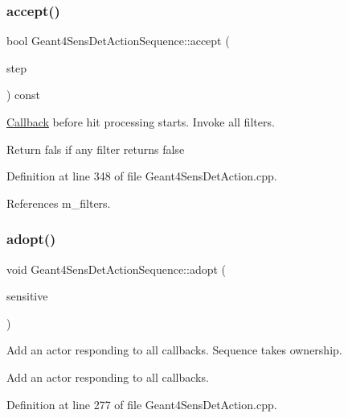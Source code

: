 \subsubsection{\texorpdfstring{accept()}{accept()}}
{\footnotesize\ttfamily bool Geant4\+Sens\+Det\+Action\+Sequence\+::accept (\begin{DoxyParamCaption}\item[{const G4\+Step $\ast$}]{step }\end{DoxyParamCaption}) const}



\hyperlink{class_d_d4hep_1_1_callback}{Callback} before hit processing starts. Invoke all filters. 

Return fals if any filter returns false 

Definition at line 348 of file Geant4\+Sens\+Det\+Action.\+cpp.



References m\+\_\+filters.

\hypertarget{class_d_d4hep_1_1_simulation_1_1_geant4_sens_det_action_sequence_a01437840682e0edbee69d11c99f73b5f}{}\label{class_d_d4hep_1_1_simulation_1_1_geant4_sens_det_action_sequence_a01437840682e0edbee69d11c99f73b5f} 
\subsubsection{\texorpdfstring{adopt()}{adopt()}\hspace{0.1cm}{\footnotesize\ttfamily [1/2]}}
{\footnotesize\ttfamily void Geant4\+Sens\+Det\+Action\+Sequence\+::adopt (\begin{DoxyParamCaption}\item[{\hyperlink{class_d_d4hep_1_1_simulation_1_1_geant4_sensitive}{Geant4\+Sensitive} $\ast$}]{sensitive }\end{DoxyParamCaption})}



Add an actor responding to all callbacks. Sequence takes ownership. 

Add an actor responding to all callbacks. 

Definition at line 277 of file Geant4\+Sens\+Det\+Action.\+cpp.



